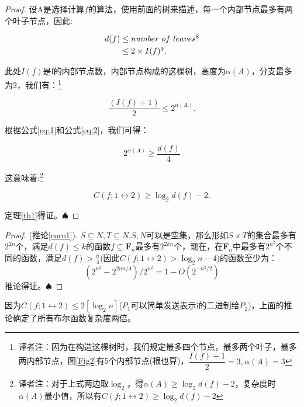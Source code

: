 \documentclass[]{article}
\newtheorem*{proof}{证明}
\begin{document}
	\begin{proof}
		设A是选择计算$f$的算法，使用前面的树来描述，每一个内部节点最多有两个叶子节点，因此:\par
		\begin{equation}\label{eq:1}
			\begin{aligned}
			d(f) & \leq number\ of\ leaves\footnotemark[8] \\
			& \leq 2 \times I(f)\footnotemark[9] ,
			\end{aligned}
		\end{equation}
		\par
		此处$I(f)$是f的内部节点数，内部节点构成的这棵树，高度为$\alpha(A)$，分支最多为2，我们有：\footnote{译者注：因为在构造这棵树时，我们规定最多四个节点，最多两个叶子，最多两内部节点，图\ref{Fig2}有5个内部节点(根也算)，$\dfrac{I(f)+1}{2}=3,\alpha(A)=3$}
		\par
		\begin{equation}\label{eq:2}
			\dfrac{(I(f)+1)}{2} \leq 2^{\alpha(A)}.
		\end{equation}
		\par
		根据公式\ref{eq:1}和公式\ref{eq:2}，我们可得：\par
		\begin{equation}\nonumber
			2^{\alpha(A)}\geq \dfrac{d(f)}{4}
		\end{equation}
		\par
		这意味着:\footnote{译者注：对于上式两边取$\log_2$，得$\alpha(A)\geq \log_2 d(f) -2$，复杂度时$\alpha(A)$最小值，所以有$C(f;1\leftrightarrow 2)\geq \log_2 d(f) -2$}
		\par
		\begin{equation}\nonumber
		    C(f;1\leftrightarrow 2)\geq \log_2 d(f) -2.
		\end{equation}
		\par
		定理\ref{th1}得证。$\spadesuit$
	\end{proof}
	\par
	\begin{proof}
		(推论\ref{coro1}). $S\subseteq N,T\subseteq N$,$S,N$可以是空集，那么形如$S\times T$的集合最多有$2^{2n}$个，满足$d(f)\leq k$的函数$f\subseteq \mathbf{F}_n$最多有$2^{2kn}$个，现在，在$\mathbf{F}_n$中最多有$2^{n^2}$个不同的函数，满足$d(f)>\frac{n}{4}$(因此$C(f;1\leftrightarrow 2)> \log_2 n -4$)的函数至少为：
		\[(2^{n^2}-2^{2nn/4})/2^{n^2} = 1-O(2^{-n^2/2})\]
		推论得证。$\spadesuit$
	\end{proof}
	\par
	因为$ C(f;1\leftrightarrow 2)\leq 2 \left[  \log_2 n \right] $($P_1$可以简单发送表示i的二进制给$P_2$)，上面的推论确定了所有布尔函数复杂度两倍。\par
	
\end{document}

